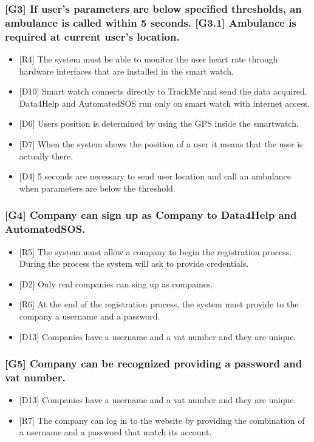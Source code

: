 \documentclass{article}
\begin{document}
\subsubsection{[G3] If user's parameters are below specified thresholds, an ambulance is called within 5 seconds. [G3.1] Ambulance is required at current user's location.}
\begin{itemize}
\item {[R4]} The system must be able to monitor the user heart rate through hardware interfaces that are installed in the smart watch.
\item {[D10]} Smart watch connects directly to TrackMe and send the data acquired. Data4Help and AutomatedSOS run only on smart watch with internet access.
\item {[D6]} Users position is determined by using the GPS inside the smartwatch.
\item {[D7]} When the system shows the position of a user it means that the user is actually there.
\item {[D4]} 5 seconds are necessary to send user location and call an ambulance when parameters are below the threshold.
\end{itemize}
\subsubsection{[G4] Company can sign up as Company to Data4Help and AutomatedSOS.}
\begin{itemize}
\item {[R5]} The system must allow a company to begin the registration process. During the process the system will ask to provide credentials.
\item {[D2]} Only real companies can sing up as compaines.
\item {[R6]} At the end of the registration process, the system must provide to the company a username and a password.
\item {[D13]} Companies have a username and a vat number and they are unique.
\end{itemize}
\subsubsection{[G5] Company can be recognized providing a password and vat number.}
\begin{itemize}
\item {[D13]} Companies have a username and a vat number and they are unique.
\item {[R7]} The company can log in to the website by providing the combination of a username and a password that match its account.
\end{itemize}
\end{document}
